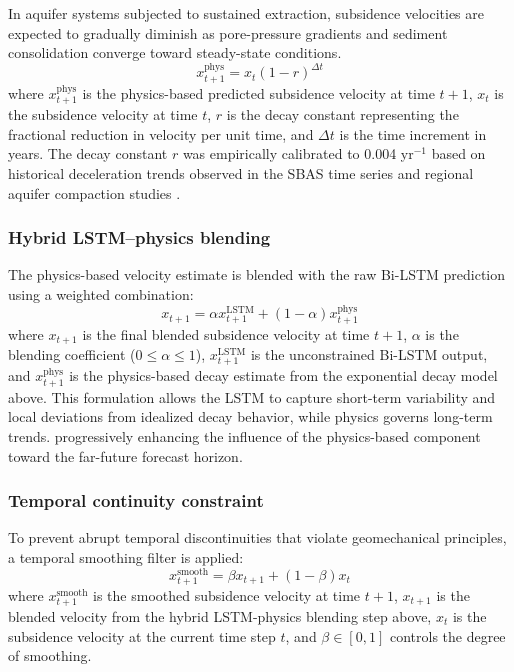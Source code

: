 \documentclass[oneside,doublespacing,flushright]{lsuthesis}
\begin{document}
In aquifer systems subjected to sustained extraction, subsidence velocities are expected to gradually diminish as pore-pressure gradients and sediment consolidation converge toward steady-state conditions.
\begin{equation}
x_{t+1}^{\text{phys}} = x_t (1 - r)^{\Delta t}
\end{equation}
where $x_{t+1}^{\text{phys}}$ is the physics-based predicted subsidence velocity at time $t+1$, $x_t$ is the subsidence velocity at time $t$, $r$ is the decay constant representing the fractional reduction in velocity per unit time, and $\Delta t$ is the time increment in years. The decay constant $r$ was empirically calibrated to 0.004 yr$^{-1}$ based on historical deceleration trends observed in the SBAS time series and regional aquifer compaction studies \citep{Higgins2016}.

\subsubsection{Hybrid LSTM--physics blending}

The physics-based velocity estimate is blended with the raw Bi-LSTM prediction using a weighted combination:
\begin{equation}
x_{t+1} = \alpha x_{t+1}^{\text{LSTM}} + (1 - \alpha) x_{t+1}^{\text{phys}}
\end{equation}
where $x_{t+1}$ is the final blended subsidence velocity at time $t+1$, $\alpha$ is the blending coefficient ($0 \leq \alpha \leq 1$), $x_{t+1}^{\text{LSTM}}$ is the unconstrained Bi-LSTM output, and $x_{t+1}^{\text{phys}}$ is the physics-based decay estimate from the exponential decay model above. This formulation allows the LSTM to capture short-term variability and local deviations from idealized decay behavior, while physics governs long-term trends.
progressively enhancing the influence of the physics-based component toward the far-future forecast horizon.

\subsubsection{Temporal continuity constraint}

To prevent abrupt temporal discontinuities that violate geomechanical principles, a temporal smoothing filter is applied:
\begin{equation}
x_{t+1}^{\text{smooth}} = \beta x_{t+1} + (1 - \beta) x_t
\end{equation}
where $x_{t+1}^{\text{smooth}}$ is the smoothed subsidence velocity at time $t+1$, $x_{t+1}$ is the blended velocity from the hybrid LSTM-physics blending step above, $x_t$ is the subsidence velocity at the current time step $t$, and $\beta \in [0,1]$ controls the degree of smoothing.
\end{document}
